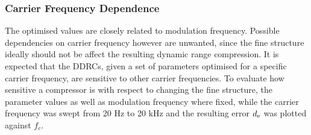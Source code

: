 \documentclass[../main2.tex]{subfiles}
\begin{document}
\subsubsection{Carrier Frequency Dependence}
The optimised values are closely related to modulation frequency. Possible dependencies on carrier frequency however are unwanted, since the fine structure ideally should not be affect the resulting dynamic range compression. It is expected that the DDRCs, given a set of parameters optimised for a specific carrier frequency, are sensitive to other carrier frequencies. To evaluate how sensitive a compressor is with respect to changing the fine structure, the parameter values as well as modulation frequency where fixed, while the carrier frequency was swept from 20 Hz to 20 kHz and the resulting error $d_\text{e}$ was plotted against $f_c$.
\end{document}
